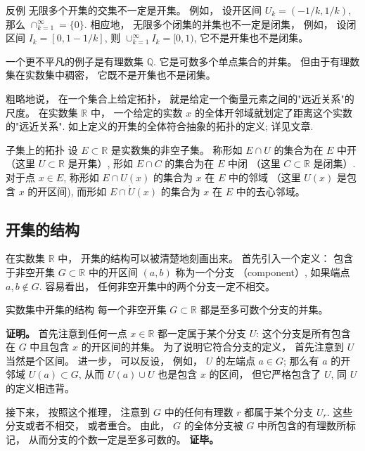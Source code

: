 \begin{example}{反例}
无限多个开集的交集不一定是开集。 例如， 设开区间 $U_k=(-1/k,1/k)$, 那么 $\cap_{k=1}^\infty=\{0\}$. 相应地， 无限多个闭集的并集也不一定是闭集， 例如， 设闭区间 $I_k=[0,1-1/k]$, 则 $\cup_{k=1}^\infty I_k=[0,1)$, 它不是开集也不是闭集。

一个更不平凡的例子是有理数集 $\mathbb{Q}$. 它是可数多个单点集合的并集。 但由于有理数集在实数集中稠密， 它既不是开集也不是闭集。
\end{example}

粗略地说， 在一个集合上给定拓扑， 就是给定一个衡量元素之间的"远近关系"的尺度。 在实数集 $\mathbb{R}$ 中， 一个给定的实数 $x$ 的全体开邻域就划定了距离这个实数的"远近关系". 如上定义的开集的全体符合抽象的拓扑的定义; 详见文章.

\begin{definition}{子集上的拓扑}
设 $E\subset\mathbb{R}$ 是实数集的非空子集。 称形如 $E\cap U$ 的集合为在 $E$ 中开 （这里 $U\subset\mathbb{R}$ 是开集）, 形如 $E\cap C$ 的集合为在 $E$ 中闭 （这里 $C\subset\mathbb{R}$ 是闭集）. 对于点 $x\in E$, 称形如 $E\cap U(x)$ 的集合为 $x$ 在 $E$ 中的邻域 （这里 $U(x)$ 是包含 $x$ 的开区间), 而形如 $E\cap \mathring U(x)$ 的集合为 $x$ 在 $E$ 中的去心邻域。
\end{definition}

\subsection{开集的结构}
在实数集 $\mathbb{R}$ 中， 开集的结构可以被清楚地刻画出来。 首先引入一个定义： 包含于非空开集 $G\subset\mathbb{R}$ 中的开区间 $(a,b)$ 称为一个分支 （component）, 如果端点 $a,b\notin G$. 容易看出， 任何非空开集中的两个分支一定不相交。

\begin{theorem}{实数集中开集的结构}
每一个非空开集 $G\subset\mathbb{R}$ 都是至多可数个分支的并集。 
\end{theorem}
\textbf{证明。} 首先注意到任何一点 $x\in\mathbb{R}$ 都一定属于某个分支 $U$: 这个分支是所有包含在 $G$ 中且包含 $x$ 的开区间的并集。 为了说明它符合分支的定义， 首先注意到 $U$ 当然是个区间。 进一步， 可以反设， 例如， $U$ 的左端点 $a\in G$; 那么有 $a$ 的开邻域 $U(a)\subset G$, 从而 $U(a)\cup U$ 也是包含 $x$ 的区间， 但它严格包含了 $U$, 同 $U$ 的定义相违背。

接下来， 按照这个推理， 注意到 $G$ 中的任何有理数 $r$ 都属于某个分支 $U_r$. 这些分支或者不相交， 或者重合。 由此， $G$ 的全体分支被 $G$ 中所包含的有理数所标记， 从而分支的个数一定是至多可数的。 \textbf{证毕。}

